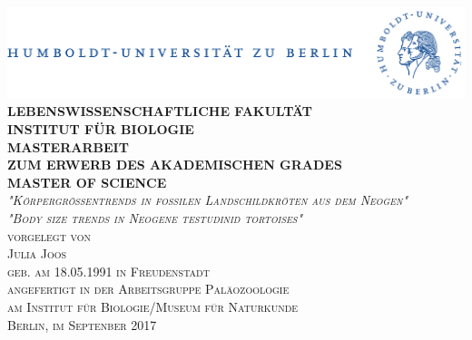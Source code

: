 \documentclass[toc=bibliographynumbered, listof=totoc]{scrartcl} %
\begin{document}
\begin{titlepage}
\begin{center}
\includegraphics[scale=0.65]{pics/hulogo.pdf}\\[1cm]

\textsc{\textbf{\normalsize LEBENSWISSENSCHAFTLICHE FAKULTÄT\\[0.2cm]  INSTITUT FÜR BIOLOGIE\\[1.5cm]
\LARGE MASTERARBEIT\\[0.5cm]
\normalsize ZUM ERWERB DES AKADEMISCHEN GRADES\\[0.5cm] MASTER OF SCIENCE\\[2cm]}
\normalfont %
\textit{\large "Körpergrößentrends in fossilen Landschildkröten aus dem Neogen"\\[0.5cm]
"Body size trends in Neogene testudinid tortoises" }\\[2cm]
\small vorgelegt von\\[0.5cm] Julia Joos \\[0.2cm] geb. am 18.05.1991 in Freudenstadt \\[1cm] angefertigt in der Arbeitsgruppe Paläozoologie\\[0.2cm]
am Institut für Biologie/Museum für Naturkunde\\[1cm]
Berlin, im Septenber 2017}
\end{center}


\end{titlepage}


\tableofcontents
\newpage
\listoffigures  
\newpage                       
\listoftables                     
\newpage

\newpage

\newpage

\newpage

\newpage

\FloatBarrier
\newpage

\setcounter{table}{0}
\renewcommand{\thetable}{S\arabic{table}} %
\setcounter{figure}{0}
\renewcommand{\thefigure}{S\arabic{figure}} %
\begin{appendices}


\newpage




\end{appendices}
\newpage


\end{document}
